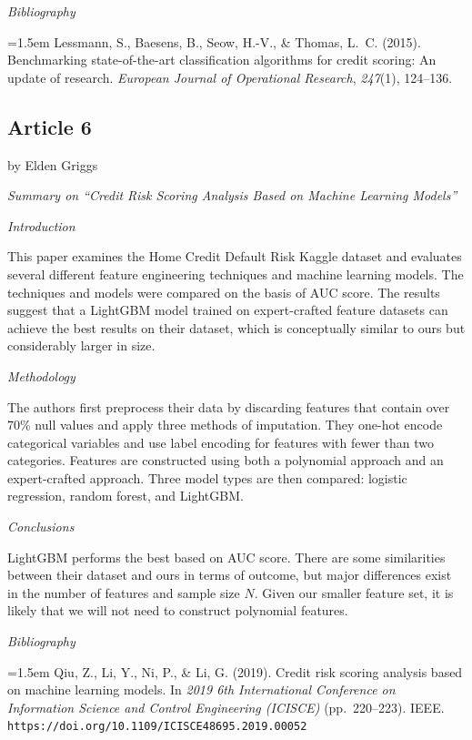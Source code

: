 \documentclass[letterpaper]{article}
\begin{document}
	\medskip
	
	\textit{Bibliography}
	
	\hangindent=1.5em
	Lessmann, S., Baesens, B., Seow, H.-V., \& Thomas, L.~C. (2015). Benchmarking state-of-the-art classification algorithms for credit scoring: An update of research. \textit{European Journal of Operational Research}, \textit{247}(1), 124--136.
	
	
	\subsection{Article 6}
	
	{\color{deepred} by Elden Griggs}
	
	\textit{Summary on ``Credit Risk Scoring Analysis Based on Machine Learning Models''}
	
	
	\textit{Introduction}
	
	This paper examines the Home Credit Default Risk Kaggle dataset and evaluates several different feature engineering techniques and machine learning models. The techniques and models were compared on the basis of AUC score. The results suggest that a LightGBM model trained on expert-crafted feature datasets can achieve the best results on their dataset, which is conceptually similar to ours but considerably larger in size.
	
	\medskip
	
	\textit{Methodology}
	
	The authors first preprocess their data by discarding features that contain over 70\% null values and apply three methods of imputation. They one-hot encode categorical variables and use label encoding for features with fewer than two categories. Features are constructed using both a polynomial approach and an expert-crafted approach. Three model types are then compared: logistic regression, random forest, and LightGBM.
	
	\medskip
	
	\textit{Conclusions}
	
	LightGBM performs the best based on AUC score. There are some similarities between their dataset and ours in terms of outcome, but major differences exist in the number of features and sample size $N$. Given our smaller feature set, it is likely that we will not need to construct polynomial features.
	
	\medskip
	
	\textit{Bibliography}
	
	\hangindent=1.5em
	Qiu, Z., Li, Y., Ni, P., \& Li, G. (2019). Credit risk scoring analysis based on machine learning models. In \textit{2019 6th International Conference on Information Science and Control Engineering (ICISCE)} (pp.\ 220--223). IEEE. \texttt{https://doi.org/10.1109/ICISCE48695.2019.00052}
	
\end{document}
